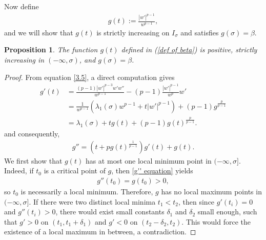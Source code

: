 \documentclass[11pt,leqno]{amsart}
\newtheorem{proposition}{Proposition}[section]
\numberwithin{equation}{section}
\begin{document}
Now define
\begin{align}\label{def of beta}
   g(t):=\frac{|w'|^{p-1}}{w^{p-1}},
\end{align}
and we will show  that $g(t)$ is strictly increasing on $I_\sigma$ and satisfies $g(\sigma)=\beta$.
\begin{proposition}\label{monotone of beta prop}
    The function $g(t)$ defined in (\ref{def of beta}) is positive, strictly increasing in $(-\infty,\sigma)$,
and $g(\sigma) = \beta$.
\end{proposition}
\begin{proof} 
From equation \eqref{3.5},
a direct computation gives
\begin{align}\label{3.10}
    g'(t)&=\frac{(p-1)|w'|^{p-3}w'w''}{w^{p-1}}-(p-1)\frac{|w'|^{p-1}}{w^{p}}w'\nonumber\\
    &=\frac{1}{w^{p-1}}(\lambda_1(\sigma) w^{p-1}+t|w'|^{p-1})+(p-1)g^{\frac{p}{p-1}}\nonumber\\
    &=\lambda_1(\sigma) +tg(t)+(p-1)g(t)^{\frac{p}{p-1}}.
\end{align}
and consequently,
\begin{align}\label{g'' equation}
    g''=(t+pg(t)^{\frac{1}{p-1}})g'(t)+g(t).
\end{align}
We first show that $g(t)$ has at most one local minimum point in 
$(-\infty,\sigma]$.   Indeed, if  $t_{0}$ is a critical point of $g$, then \eqref{g'' equation} yields
\begin{align*}
    g''(t_{0})=g(t_{0})>0,
\end{align*}
so $t_{0}$ is necessarily a local minimum. Therefore,  $g$ has no local maximum points in $(-\infty,\sigma]$. If there were  two distinct local minima  $t_1< t_2$, then since $g'(t_i)=0$ and
$g''(t_i)>0$,  there would exist small 
 constants $\delta_1$ and $\delta_2$ small enough, such that $g'>0$ on  $ (t_{1}, t_{1}+\delta_1)$ and $g'<0$ on  $(t_{2}-\delta_2, t_{2})$. This would force the existence of a local  maximum  in between, a contradiction.


\end{proof}
\end{document}

